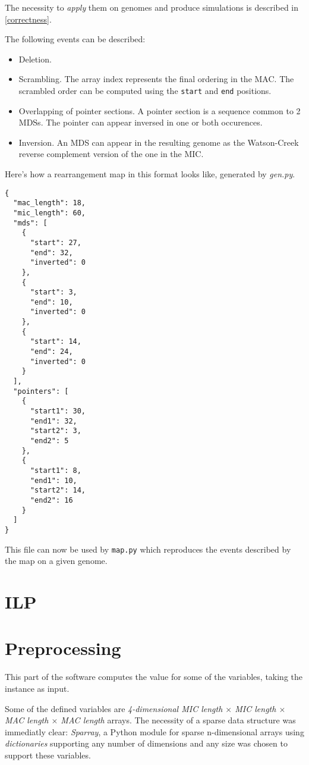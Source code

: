 The necessity to \textit{apply} them on genomes and produce simulations is described in \ref{correctness}.

The following events can be described:

\begin{itemize}
	\item Deletion.
	\item Scrambling. The array index represents the final ordering in the MAC. The scrambled order can be computed using the \texttt{start} and \texttt{end} positions.
	\item Overlapping of pointer sections. A pointer section is a sequence common to 2 MDSs. The pointer can appear inversed in one or both occurences.
	\item Inversion. An MDS can appear in the resulting genome as the Watson-Creek reverse complement version of the one in the MIC.
\end{itemize}

Here's how a rearrangement map in this format looks like, generated by \textit{gen.py}.

\begin{verbatim}
{
  "mac_length": 18,
  "mic_length": 60,
  "mds": [
    {
      "start": 27,
      "end": 32,
      "inverted": 0
    },
    {
      "start": 3,
      "end": 10,
      "inverted": 0
    },
    {
      "start": 14,
      "end": 24,
      "inverted": 0
    }
  ],
  "pointers": [
    {
      "start1": 30,
      "end1": 32,
      "start2": 3,
      "end2": 5
    },
    {
      "start1": 8,
      "end1": 10,
      "start2": 14,
      "end2": 16
    }
  ]
}
\end{verbatim}

This file can now be used by \texttt{map.py} which reproduces the events described by the map on a given genome.

\section{ILP}


\section{Preprocessing}
This part of the software computes the value for some of the variables, taking the instance as input.

Some of the defined variables are \textit{4-dimensional MIC length $\times$ MIC length $\times$ MAC length $\times$ MAC length} arrays. The necessity of a sparse data structure was immediatly clear: \textit{Sparray}, a Python module \cite{sparray} for sparse n-dimensional arrays using \textit{dictionaries} supporting any number of dimensions and any size was chosen to support these variables.

